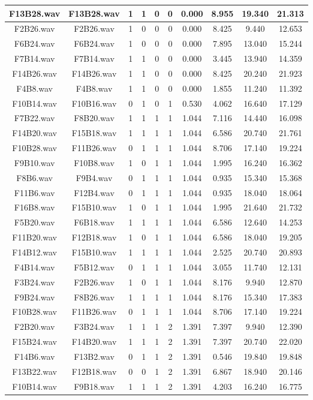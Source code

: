 \documentclass[11pt,a4paper,twoside]{book}
\begin{document}
\begin{longtable}[c]{|c|c|c|c|c|c|c|c|c|c|}
		F13B28.wav&F13B28.wav&1&1&0&0&0.000&8.955&19.340&21.313\\ \hline
F2B26.wav&F2B26.wav&1&0&0&0&0.000&8.425&9.440&12.653\\ \hline
F6B24.wav&F6B24.wav&1&0&0&0&0.000&7.895&13.040&15.244\\ \hline
F7B14.wav&F7B14.wav&1&1&0&0&0.000&3.445&13.940&14.359\\ \hline
F14B26.wav&F14B26.wav&1&1&0&0&0.000&8.425&20.240&21.923\\ \hline
F4B8.wav&F4B8.wav&1&1&0&0&0.000&1.855&11.240&11.392\\ \hline
F10B14.wav&F10B16.wav&0&1&0&1&0.530&4.062&16.640&17.129\\ \hline
F7B22.wav&F8B20.wav&1&1&1&1&1.044&7.116&14.440&16.098\\ \hline
F14B20.wav&F15B18.wav&1&1&1&1&1.044&6.586&20.740&21.761\\ \hline
F10B28.wav&F11B26.wav&0&1&1&1&1.044&8.706&17.140&19.224\\ \hline
F9B10.wav&F10B8.wav&1&0&1&1&1.044&1.995&16.240&16.362\\ \hline
F8B6.wav&F9B4.wav&0&1&1&1&1.044&0.935&15.340&15.368\\ \hline
F11B6.wav&F12B4.wav&0&1&1&1&1.044&0.935&18.040&18.064\\ \hline
F16B8.wav&F15B10.wav&1&0&1&1&1.044&1.995&21.640&21.732\\ \hline
F5B20.wav&F6B18.wav&1&1&1&1&1.044&6.586&12.640&14.253\\ \hline
F11B20.wav&F12B18.wav&1&0&1&1&1.044&6.586&18.040&19.205\\ \hline
F14B12.wav&F15B10.wav&1&1&1&1&1.044&2.525&20.740&20.893\\ \hline
F4B14.wav&F5B12.wav&0&1&1&1&1.044&3.055&11.740&12.131\\ \hline
F3B24.wav&F2B26.wav&1&0&1&1&1.044&8.176&9.940&12.870\\ \hline
F9B24.wav&F8B26.wav&1&1&1&1&1.044&8.176&15.340&17.383\\ \hline
F10B28.wav&F11B26.wav&0&1&1&1&1.044&8.706&17.140&19.224\\ \hline
F2B20.wav&F3B24.wav&1&1&1&2&1.391&7.397&9.940&12.390\\ \hline
F15B24.wav&F14B20.wav&1&1&1&2&1.391&7.397&20.740&22.020\\ \hline
F14B6.wav&F13B2.wav&0&1&1&2&1.391&0.546&19.840&19.848\\ \hline
F13B22.wav&F12B18.wav&0&0&1&2&1.391&6.867&18.940&20.146\\ \hline
F10B14.wav&F9B18.wav&1&1&1&2&1.391&4.203&16.240&16.775\\ \hline

\end{longtable}
\end{document}
